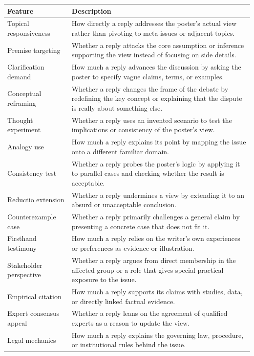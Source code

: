 \begin{tabularx}{\textwidth}{@{}>{\raggedright\arraybackslash}p{} X@{}}
\toprule
Feature & Description \\
\midrule
Topical responsiveness & How directly a reply addresses the poster's actual view rather than pivoting to meta-issues or adjacent topics. \\
Premise targeting & Whether a reply attacks the core assumption or inference supporting the view instead of focusing on side details. \\
Clarification demand & How much a reply advances the discussion by asking the poster to specify vague claims, terms, or examples. \\
Conceptual reframing & Whether a reply changes the frame of the debate by redefining the key concept or explaining that the dispute is really about something else. \\
Thought experiment & Whether a reply uses an invented scenario to test the implications or consistency of the poster's view. \\
Analogy use & How much a reply explains its point by mapping the issue onto a different familiar domain. \\
Consistency test & Whether a reply probes the poster's logic by applying it to parallel cases and checking whether the result is acceptable. \\
Reductio extension & Whether a reply undermines a view by extending it to an absurd or unacceptable conclusion. \\
Counterexample case & Whether a reply primarily challenges a general claim by presenting a concrete case that does not fit it. \\
Firsthand testimony & How much a reply relies on the writer's own experiences or preferences as evidence or illustration. \\
Stakeholder perspective & Whether a reply argues from direct membership in the affected group or a role that gives special practical exposure to the issue. \\
Empirical citation & How much a reply supports its claims with studies, data, or directly linked factual evidence. \\
Expert consensus appeal & Whether a reply leans on the agreement of qualified experts as a reason to update the view. \\
Legal mechanics & How much a reply explains the governing law, procedure, or institutional rules behind the issue. \\

\end{tabularx}
